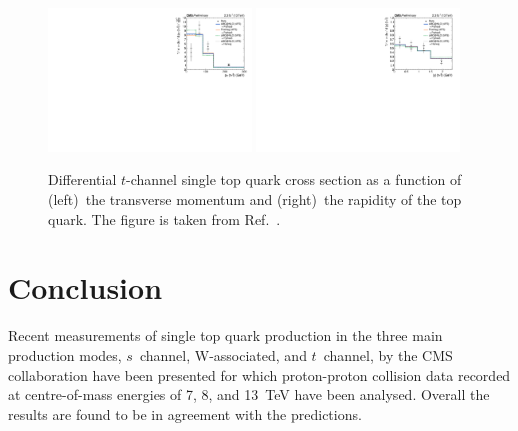 \documentclass{PoS}
\begin{document}
\begin{figure}[!htb]
\begin{center}
\includegraphics[width=0.48\textwidth]{unfolded_top_pt.pdf}\hspace{0.02\textwidth}
\includegraphics[width=0.48\textwidth]{unfolded_top_y.pdf}
\caption{\label{fig:t-channel-diff}Differential $t$-channel single top quark cross section as a function of (left)~the transverse momentum and (right)~the rapidity of the top quark. The figure is taken from Ref.~\cite{tchdiff}.}
\end{center}
\end{figure}

\section{Conclusion}

Recent measurements of single top quark production in the three main production modes, $s$~channel, W-associated, and $t$~channel, by the CMS collaboration have been presented for which proton-proton collision data recorded at centre-of-mass energies of 7, 8, and 13~TeV have been analysed. Overall the results are found to be in agreement with the predictions.
\end{document}
